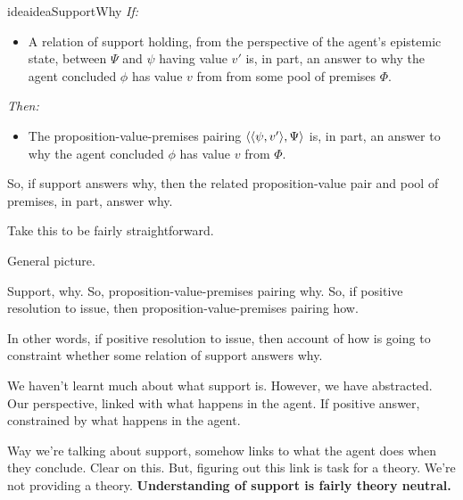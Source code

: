\begin{note}
  \begin{restatable}{idea}{ideaSupportWhy}
    \label{assu:why:support:pvpp}
    \emph{If:}
    \begin{itemize}
    \item
      A relation of support holding, from the perspective of the agent's epistemic state, between \(\Psi\) and \(\psi\) having value \(v'\) is, in part, an answer to why the agent concluded \(\phi\) has value \(v\) from from some pool of premises \(\Phi\).
    \end{itemize}
    \emph{Then:}
    \begin{itemize}
    \item
      The proposition-value-premises pairing \(\langle \langle \psi, v' \rangle, \Psi \rangle\) is, in part, an answer to why the agent concluded \(\phi\) has value \(v\) from \(\Phi\).
    \end{itemize}
    \vspace{-\baselineskip}
  \end{restatable}
\end{note}

\begin{note}
  So, if support answers why, then the related proposition-value pair and pool of premises, in part, answer why.

  Take this to be fairly straightforward.
\end{note}

\begin{note}
  General picture.

  Support, why.
  So, proposition-value-premises pairing why.
  So, if positive resolution to issue, then proposition-value-premises pairing how.

  In other words, if positive resolution to issue, then account of how is going to constraint whether some relation of support answers why.

  We haven't learnt much about what support is.
  However, we have abstracted.
  Our perspective, linked with what happens in the agent.
  If positive answer, constrained by what happens in the agent.

  Way we're talking about support, somehow links to what the agent does when they conclude.
  Clear on this.
  But, figuring out this link is task for a theory.
  We're not providing a theory.
  \textbf{Understanding of support is fairly theory neutral.}
\end{note}

